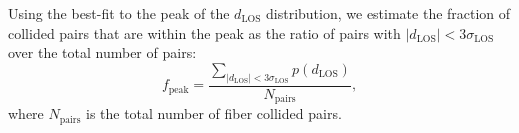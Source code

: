                                                                                                                                                                                                                                                                     Using the best-fit to the peak of the $d_{\mathrm{LOS}}$ distribution, 
                                                                                                                                                                                                                                                                    we estimate the fraction of collided pairs that are within the peak as 
                                                                                                                                                                                                                                                                    the ratio of pairs with $|d_\mathrm{LOS}| < 3\sigma_\mathrm{LOS}$ 
                                                                                                                                                                                                                                                                    over the total number of pairs:  
                                                                                                                                                                                                                                                                    \begin{equation} \label{eq:fpeak}
                                                                                                                                                                                                                                                                      f_{\mathrm{peak}} = \frac{\sum\limits_{|d_\mathrm{LOS}| < 3 \sigma_\mathrm{LOS}} p(d_{\mathrm{LOS}})}{N_{\mathrm{pairs}}}, 
                                                                                                                                                                                                                                                                      \end{equation}
                                                                                                                                                                                                                                                                      where $N_{\mathrm{pairs}}$ is the total number of fiber collided pairs. 
